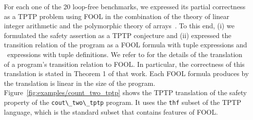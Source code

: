For each one of the 20 loop-free benchmarks, we expressed its partial
correctness as a TPTP problem using FOOL in the combination of the  theory of
linear integer arithmetic and the polymorphic theory of
arrays~\cite{VampireAndFOOL}. To this end, (i) we formulated the
safety assertion as a TPTP conjecture and (ii) expressed the
transition relation of the program as a FOOL formula with tuple
expressions and \LETIN\ expressions with tuple definitions.
We refer to \cite{VampireAndFOOL} for the details of the translation of a program's transition relation to FOOL. In particular, the correctness of this translation is stated in Theorem 1 of that work. Each FOOL formula produces by the translation is linear in the size of the program. Figure~\ref{fig:examples/count_two_tptp} shows the TPTP translation of the safety property of the \verb'cout\_two\_tptp' program. It uses the {\tt thf} subset of the TPTP language, which is the standard subset that contains features of FOOL.

%
%


